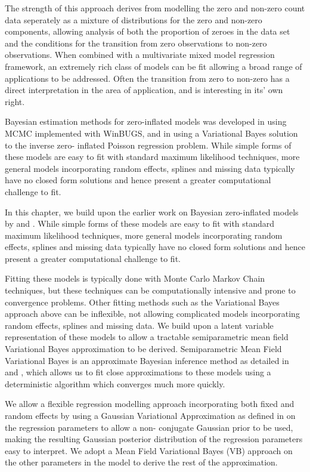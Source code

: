 The strength of this approach derives from modelling the zero and non-zero count data seperately as a mixture
of distributions for the zero and non-zero components, allowing analysis of both the proportion of zeroes in
the data set and the conditions for the transition from zero observations to non-zero observations. When
combined with a multivariate mixed model regression framework, an extremely rich class of models can be fit
allowing a broad range of applications to be addressed. Often the transition from zero to non-zero has a
direct interpretation in the area of application, and is interesting in its' own right.

Bayesian estimation methods for zero-inflated models was developed in \citep{Ghosh2006} using MCMC
implemented with WinBUGS, and in \citep{Vatsa2014} using a Variational Bayes solution to the inverse zero-
inflated Poisson regression problem. While simple forms of these models are easy to fit with standard  maximum
likelihood techniques, more general models incorporating random effects, splines and missing data  typically
have no closed form solutions and hence present a greater computational challenge to fit.

In this chapter, we build upon the earlier work on Bayesian zero-inflated models by \citep{Ghosh2006} and
\citep{Vatsa2014}. While simple forms of these models are easy to fit with standard maximum likelihood
techniques, more general models incorporating random effects, splines and missing data typically have no
closed form solutions and hence present a greater computational challenge to fit.

Fitting these models is typically done with Monte Carlo Markov Chain techniques, but these techniques can be
computationally intensive and prone to convergence problems.  Other fitting methods such as the Variational
Bayes approach above can be inflexible, not allowing complicated models incorporating random effects, splines
and missing data. We build upon a latent variable representation of these models to allow a tractable
semiparametric mean field Variational Bayes approximation to be derived. Semiparametric Mean Field Variational
Bayes is an approximate Bayesian inference method as detailed in \citep{Ormerod2010} and \citep{Rohde2015},
which allows us to fit close approximations to these models using a deterministic  algorithm which converges
much more quickly.

We allow a flexible regression modelling approach incorporating both fixed and random effects by using a
Gaussian Variational Approximation as defined in \citep{Ormerod2012} on the regression parameters to allow a
non- conjugate Gaussian prior to be used, making the resulting Gaussian posterior distribution of the
regression parameters easy to interpret. We adopt a Mean Field  Variational Bayes (VB) approach on the other
parameters in the model to derive the rest of the approximation.

